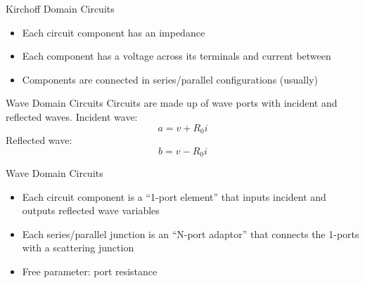 \begin{frame}
\end{frame}

\begin{frame}{Kirchoff Domain Circuits}
    \vspace{1ex}
    \begin{itemize}
        \item Each circuit component has an impedance
        \item Each component has a voltage across its terminals and current between
        \item Components are connected in series/parallel configurations (usually)
    \end{itemize}
\end{frame}

\begin{frame}{Wave Domain Circuits}
    Circuits are made up of wave ports with incident and reflected waves.\newline\newline
    \vspace{1ex}
    Incident wave:
    \begin{equation}
        a = v + R_0 i
    \end{equation}
    Reflected wave:
    \begin{equation}
        b = v - R_0 i
    \end{equation}
\end{frame}

\begin{frame}{Wave Domain Circuits}
    \vspace{1ex}
    \begin{itemize}
        \item Each circuit component is a ``1-port element'' that inputs incident and outputs reflected wave variables
        \item Each series/parallel junction is an ``N-port adaptor'' that connects the 1-ports with a scattering junction
        \item Free parameter: port resistance
    \end{itemize}
\end{frame}

